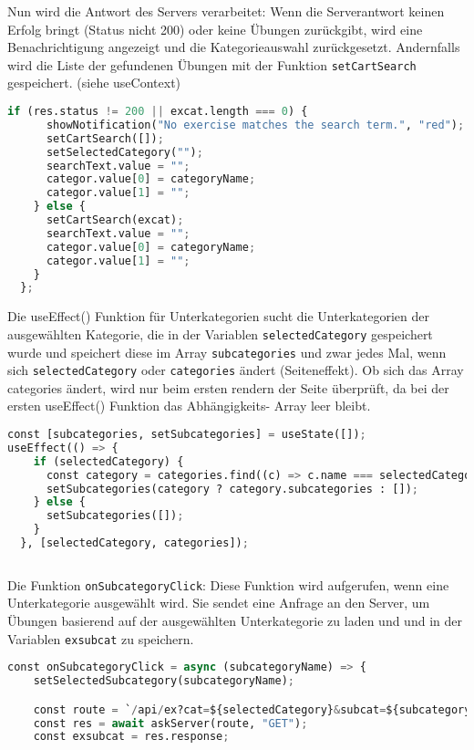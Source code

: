 Nun wird die Antwort des Servers verarbeitet: Wenn die Serverantwort keinen Erfolg bringt (Status nicht 200) oder keine Übungen zurückgibt, wird eine Benachrichtigung angezeigt und die Kategorieauswahl zurückgesetzt. Andernfalls wird die Liste der gefundenen Übungen mit der Funktion \texttt{setCartSearch} gespeichert. (siehe useContext)


\begin{lstlisting}[language=Python]
    if (res.status != 200 || excat.length === 0) {
      showNotification("No exercise matches the search term.", "red");
      setCartSearch([]);
      setSelectedCategory("");
      searchText.value = "";
      categor.value[0] = categoryName;
      categor.value[1] = "";
    } else {
      setCartSearch(excat);
      searchText.value = "";
      categor.value[0] = categoryName;
      categor.value[1] = "";
    }
  };


\end{lstlisting}



Die useEffect() Funktion für Unterkategorien sucht die Unterkategorien der ausgewählten Kategorie, die in der Variablen \texttt{selectedCategory} gespeichert wurde und speichert diese im Array \texttt{subcategories} und zwar jedes Mal, wenn sich \texttt{selectedCategory} oder \texttt{categories} ändert (Seiteneffekt). Ob sich das Array categories ändert, wird nur beim ersten rendern der Seite überprüft, da bei der ersten useEffect() Funktion das Abhängigkeits- Array leer bleibt.


\begin{lstlisting}[language=Python]
const [subcategories, setSubcategories] = useState([]);
useEffect(() => {
    if (selectedCategory) {
      const category = categories.find((c) => c.name === selectedCategory);
      setSubcategories(category ? category.subcategories : []);
    } else {
      setSubcategories([]);
    }
  }, [selectedCategory, categories]);
      
\end{lstlisting}





Die Funktion \texttt{onSubcategoryClick}: Diese Funktion wird aufgerufen, wenn eine Unterkategorie ausgewählt wird. Sie sendet eine Anfrage an den Server, um Übungen basierend auf der ausgewählten Unterkategorie zu laden und und in der Variablen \texttt{exsubcat} zu speichern.

\begin{lstlisting}[language=Python]
  const onSubcategoryClick = async (subcategoryName) => {
    setSelectedSubcategory(subcategoryName);

    const route = `/api/ex?cat=${selectedCategory}&subcat=${subcategoryName}`;
    const res = await askServer(route, "GET");
    const exsubcat = res.response;
    
    
\end{lstlisting}

